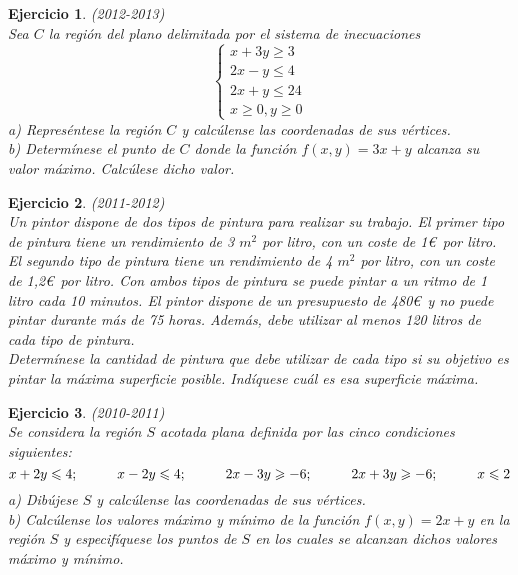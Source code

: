 \documentclass[12pt, a4paper]{amsart}
\newtheorem{ejer}{Ejercicio}
\begin{document}
\begin{ejer}\em (2012-2013)\\
Sea $C$ la región del plano delimitada por el sistema de inecuaciones
\begin{equation*}
\left \{ \begin{matrix} x+3y\geq 3
\\ 2x-y\leq 4
\\ 2x+y\leq 24
\\ x\geq 0, y\geq 0 \end{matrix}\right. 
\end{equation*}
a) Represéntese la región $C$ y calcúlense las coordenadas de sus vértices.\\
b) Determínese el punto de $C$ donde la función $f(x,y)=3x+y$ alcanza su valor máximo. Calcúlese dicho valor.
\end{ejer}

\newpage

\begin{ejer}\em (2011-2012)\\
Un pintor dispone de dos tipos de pintura para realizar su trabajo. El primer tipo de pintura tiene un rendimiento de 3 $m^2$ por litro, con un coste de 1\euro\ por litro. 
El segundo tipo de pintura tiene un rendimiento de 4 $m^2$ por litro, con un coste de 1,2\euro\ por litro. Con ambos tipos de pintura se puede pintar a un ritmo de 1 litro cada 10 minutos. El pintor dispone de un presupuesto de 480\euro\ y no puede pintar durante más de 75 horas. Además, debe utilizar al menos 120 litros de cada tipo de pintura.\\
Determínese la cantidad de pintura que debe utilizar de cada tipo si su objetivo es pintar la máxima superficie posible. Indíquese cuál es esa superficie máxima.
\end{ejer}

\begin{ejer}\em (2010-2011)\\
Se considera la región $S$ acotada plana definida por las cinco condiciones siguientes:
\[x+2y\leqslant 4;\hspace*{1cm} x-2y\leqslant 4;\hspace*{1cm} 2x-3y\geqslant -6;\hspace*{1cm} 2x+3y\geqslant -6;\hspace*{1cm} x\leqslant 2\]
a) Dibújese $S$ y calcúlense las coordenadas de sus vértices.\\
b) Calcúlense los valores máximo y mínimo de la función $f(x,y)=2x+y$ en la región $S$ y especifíquese los puntos de $S$ en los cuales se alcanzan dichos valores máximo y mínimo.
\end{ejer}
\end{document}

